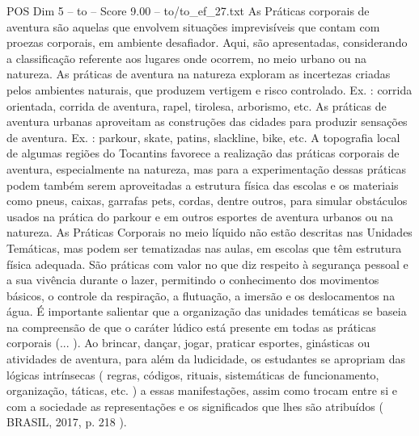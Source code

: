 \begin{textsample}{POS Dim 5 – to – Score 9.00 – to/to\_ef\_27.txt}
As Práticas corporais de aventura são aquelas que envolvem situações imprevisíveis que contam com proezas corporais, em ambiente desafiador.
Aqui, são apresentadas, considerando a classificação referente aos lugares onde ocorrem, no meio urbano ou na natureza.
As práticas de aventura na natureza exploram as incertezas criadas pelos ambientes naturais, que produzem vertigem e risco controlado.
Ex. : corrida orientada, corrida de aventura, rapel, tirolesa, arborismo, etc.
As práticas de aventura urbanas aproveitam as construções das cidades para produzir sensações de aventura.
Ex. : parkour, skate, patins, slackline, bike, etc.
A topografia local de algumas regiões do Tocantins favorece a realização das práticas corporais de aventura, especialmente na natureza, mas para a experimentação dessas práticas podem também serem aproveitadas a estrutura física das escolas e os materiais como pneus, caixas, garrafas pets, cordas, dentre outros, para simular obstáculos usados na prática do parkour e em outros esportes de aventura urbanos ou na natureza.
As Práticas Corporais no meio líquido não estão descritas nas Unidades Temáticas, mas podem ser tematizadas nas aulas, em escolas que têm estrutura física adequada.
São práticas com valor no que diz respeito à segurança pessoal e a sua vivência durante o lazer, permitindo o conhecimento dos movimentos básicos, o controle da respiração, a flutuação, a imersão e os deslocamentos na água.
É importante salientar que a organização das unidades temáticas se baseia na compreensão de que o caráter lúdico está presente em todas as práticas corporais (... ).
Ao brincar, dançar, jogar, praticar esportes, ginásticas ou atividades de aventura, para além da ludicidade, os estudantes se apropriam das lógicas intrínsecas ( regras, códigos, rituais, sistemáticas de funcionamento, organização, táticas, etc. ) a essas manifestações, assim como trocam entre si e com a sociedade as representações e os significados que lhes são atribuídos ( BRASIL, 2017, p. 218 ).

\end{textsample}
